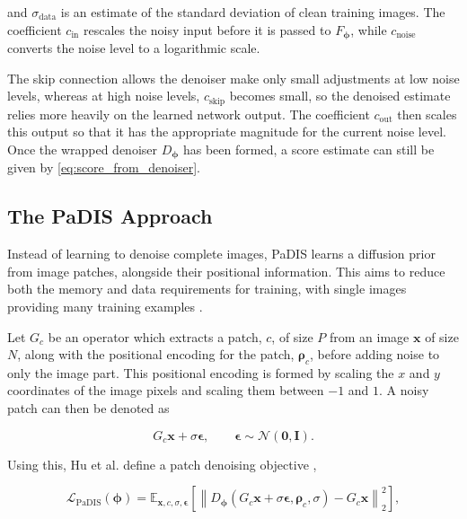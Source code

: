 and $\sigma_{\mathrm{data}}$ is an estimate of the standard deviation of
clean training images. The coefficient $c_{\mathrm{in}}$ rescales the noisy
input before it is passed to $F_{\boldsymbol{\phi}}$, while $c_{\mathrm{noise}}$
converts the noise level to a logarithmic scale.

The skip connection allows the denoiser make only small adjustments at low noise levels, whereas at high noise levels, $c_{\mathrm{skip}}$ becomes small, so the denoised estimate relies more heavily on the learned network output. The coefficient $c_{\mathrm{out}}$ then scales this output so that it has the appropriate magnitude for the current noise level. Once the wrapped denoiser $D_{\boldsymbol{\phi}}$ has been formed, a score estimate can still be given by \autoref{eq:score_from_denoiser}.

\subsection{The PaDIS Approach}
\label{subsec:padis_approach}

Instead of learning to denoise complete images, PaDIS learns a diffusion prior from image patches, alongside their positional information. This aims to reduce both the memory and data requirements for training, with single images providing many training examples \cite{PaDIS}.

Let $G_c$ be an operator which extracts a patch, $c$, of size $P$ from an image $\mathbf{x}$ of size $N$, along with the positional encoding for the patch, $\boldsymbol{\rho}_c$, before adding noise to only the image part. This positional encoding is formed by scaling the $x$ and $y$ coordinates of the image pixels and scaling them between $-1$ and $1$. A noisy patch can then be denoted as

\begin{equation}
G_c\mathbf{x}+\sigma\boldsymbol{\epsilon},
\qquad
\boldsymbol{\epsilon}\sim\mathcal{N}(\mathbf{0},\mathbf{I}).
\label{eq:noisy_patch}
\end{equation}

Using this, Hu et al. define a patch denoising objective \cite{},

\begin{equation}
\mathcal L_{\mathrm{PaDIS}}(\boldsymbol{\phi})
=
\mathbb E_{\mathbf{x},c,\sigma,\boldsymbol{\epsilon}}
\left[
\left\|
D_{\boldsymbol{\phi}}(G_c\mathbf{x}+\sigma\boldsymbol{\epsilon},\boldsymbol{\rho}_c,\sigma)
-
G_c\mathbf{x}
\right\|_2^2
\right],
\label{eq:padis_denoising_objective}
\end{equation}


